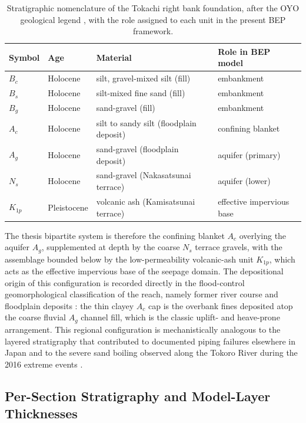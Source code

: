 \begin{table}[htbp]
\centering
\footnotesize
\caption{Stratigraphic nomenclature of the Tokachi right bank foundation, after the OYO geological legend \parencite{oyo_1999}, with the role assigned to each unit in the present BEP framework.}
\label{tab:strat_nomenclature}
\begin{tabular}{llll}
\toprule
Symbol & Age & Material & Role in BEP model \\
\midrule
$B_c$ & Holocene & silt, gravel-mixed silt (fill)            & embankment \\
$B_s$ & Holocene & silt-mixed fine sand (fill)               & embankment \\
$B_g$ & Holocene & sand-gravel (fill)                        & embankment \\
$A_c$ & Holocene & silt to sandy silt (floodplain deposit)   & confining blanket \\
$A_g$ & Holocene & sand-gravel (floodplain deposit)          & aquifer (primary) \\
$N_s$ & Holocene & sand-gravel (Nakasatsunai terrace)        & aquifer (lower) \\
$K_{1p}$ & Pleistocene & volcanic ash (Kamisatsunai terrace) & effective impervious base \\
\bottomrule
\end{tabular}
\end{table}

The thesis bipartite system is therefore the confining blanket $A_c$ overlying the aquifer $A_g$, supplemented at depth by the coarse $N_s$ terrace gravels, with the assemblage bounded below by the low-permeability volcanic-ash unit $K_{1p}$, which acts as the effective impervious base of the seepage domain. The depositional origin of this configuration is recorded directly in the flood-control geomorphological classification of the reach, namely former river course and floodplain deposits \parencite{fukuda_2025_internal}: the thin clayey $A_c$ cap is the overbank fines deposited atop the coarse fluvial $A_g$ channel fill, which is the classic uplift- and heave-prone arrangement. This regional configuration is mechanistically analogous to the layered stratigraphy that contributed to documented piping failures elsewhere in Japan and to the severe sand boiling observed along the Tokoro River during the 2016 extreme events \parencite{kawajiri_2025, tokorogawa_2017}.

\subsection{Per-Section Stratigraphy and Model-Layer Thicknesses}
\label{subsec: Per-Section Stratigraphy and Model-Layer Thicknesses}

